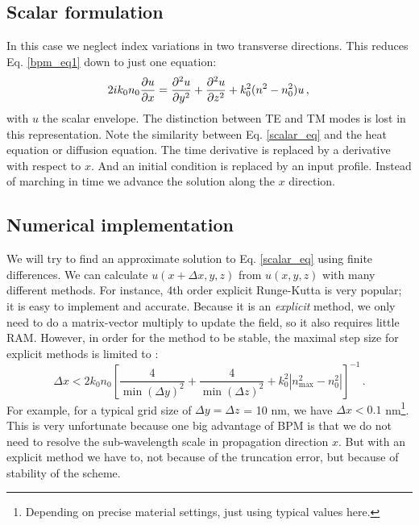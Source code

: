 \documentclass[]{article}
\begin{document}
	\subsection{Scalar formulation}
	In this case we neglect index variations in two transverse directions. This reduces Eq. \eqref{bpm_eq1} down to just one equation:
	\begin{equation}
		2i k_0 n_0 \frac{\partial u}{\partial x} = \frac{\partial^2u}{\partial y^2}+\frac{\partial^2u}{\partial z^2}+k_0^2(n^2-n_0^2)u \, ,\\
		\label{scalar_eq}
	\end{equation}
	with $u$ the scalar envelope. The distinction between TE and TM modes is lost in this representation. Note the similarity between Eq. \eqref{scalar_eq} and the heat equation or diffusion equation. The time derivative is replaced by a derivative with respect to $x$. And an initial condition is replaced by an input profile. Instead of marching in time we advance the solution along the $x$ direction.
	
	
	\subsection{Numerical implementation}	
	We will try to find an approximate solution to Eq. \eqref{scalar_eq} using finite differences. We can calculate $u(x+\Delta x,y, z)$ from $u(x,y,z)$ with many different methods. For instance, 4th order explicit Runge-Kutta is very popular; it is easy to implement and accurate. Because it is an \textit{explicit} method, we only need to do a matrix-vector multiply to update the field, so it also requires little RAM. However, in order for the method to be stable, the maximal step size for explicit methods is limited to \cite{Chung_Dagli_1991}:
	\begin{equation}
		\Delta x < 2 k_0 n_0 \left[\frac{4}{\min (\Delta y)^2} +\frac{4}{\min(\Delta z)^2}+k_0^2\left| n_{\text{max}}^2-n_0^2\right|  \right] ^{-1}\, .
	\end{equation}	
	For example, for a typical grid size of $\Delta y= \Delta z $ = 10 nm, we have $\Delta x < 0.1$ nm\footnote{Depending on precise material settings, just using typical values here.}. This is very unfortunate because one big advantage of BPM is that we do not need to resolve the sub-wavelength scale in propagation direction $x$. But with an explicit method we have to, not because of the truncation error, but because of stability of the scheme.\\
	
\end{document}
